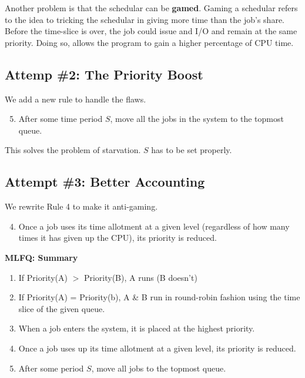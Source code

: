Another problem is that the schedular can be \textbf{gamed}. Gaming a schedular
refers to the idea to tricking the schedular in giving more time than the job's
share. Before the time-slice is over, the job could issue and I/O and remain
at the same priority. Doing so, allows the program to gain a higher percentage
of CPU time.

\subsection{Attemp \#2: The Priority Boost}

We add a new rule to handle the flaws. 

\begin{enumerate}
        \setcounter{enumi}{4}
    \item After some time period $S$, move all the jobs in the system to the
        topmost queue.
\end{enumerate}

This solves the problem of starvation. $S$ has to be set properly.

\subsection{Attempt \#3: Better Accounting}

We rewrite Rule 4 to make it anti-gaming.

\begin{enumerate}
        \setcounter{enumi}{3}
    \item Once a job uses its time allotment at a given level (regardless of
        how many times it has given up the CPU), its priority is reduced.
\end{enumerate}

\begin{tcolorbox}
    \textbf{MLFQ: Summary}
    \begin{enumerate}
        \item If Priority(A) $>$ Priority(B), A runs (B doesn't)
        \item If Priority(A) = Priority(b), A \& B run in round-robin fashion
            using the time slice of the given queue.
        \item When a job enters the system, it is placed at the highest
            priority.
        \item Once a job uses up its time allotment at a given level, its
            priority is reduced.
        \item After some period $S$, move all jobs to the topmost queue.
    \end{enumerate}
\end{tcolorbox}
